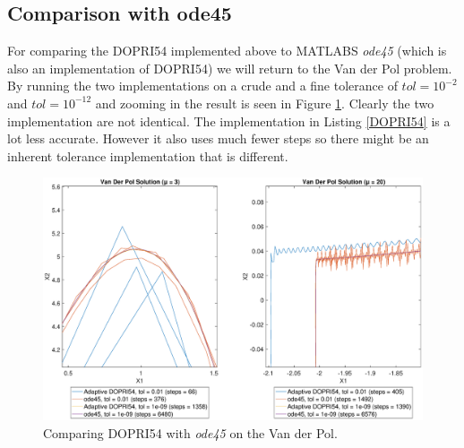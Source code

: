 \subsection{Comparison with ode45}
For comparing the DOPRI54 implemented above to MATLABS \textit{ode45} (which is also an implementation of DOPRI54) we will return to the Van der Pol problem. By running the two implementations on a crude and a fine tolerance of $tol = 10^{-2}$ and $tol = 10^{-12}$ and zooming in the result is seen in Figure \ref{fig:6_6}. Clearly the two implementation are not identical. The implementation in Listing \ref{DOPRI54} is a lot less accurate. However it also uses much fewer steps so there might be an inherent tolerance implementation that is different.
\begin{figure}[h]
    \centering
    \includegraphics[width=\textwidth]{plots/6_6finito.eps}
    \caption{Comparing DOPRI54 with \textit{ode45} on the Van der Pol.}
    \label{fig:6_6}
\end{figure}






























